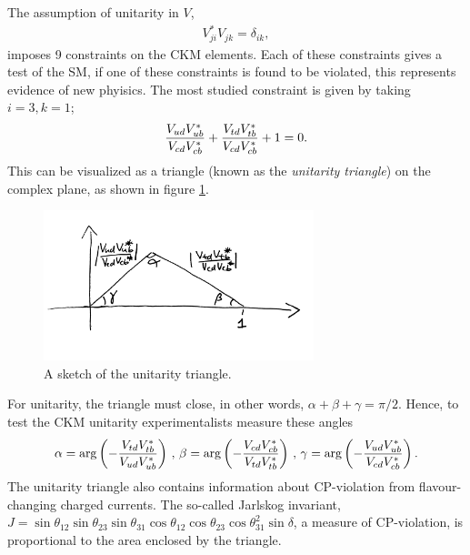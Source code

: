 The assumption of unitarity in $V$,
\begin{align}
  V_{ji}^*V_{jk}=\delta_{ik},
  \label{eq:CKMunitarity}
\end{align}
imposes 9 constraints on the CKM elements. Each of these constraints gives a test of the SM, if one of these constraints is found to be violated, this represents evidence of new phyisics. The most studied constraint is given by taking $i=3,k=1$;
\begin{align}
  {V_{ud}V_{ub}^*\over V_{cd} V_{cb}^*} + {V_{td}V_{tb}^* \over V_{cd}V_{cb}^*} + 1 = 0.
\end{align}
This can be visualized as a triangle (known as the {\it{unitarity triangle}}) on the complex plane, as shown in figure \ref{fig:unitaritytriangle_sketch}.

\begin{figure}
  \vspace{-10pt}
  \begin{center}
    \includegraphics[width=0.7\textwidth]{images/unitaritytriangle_sketch.jpg}
  \end{center}
  \vspace{-25pt}
  \caption{A sketch of the unitarity triangle.}
  \label{fig:unitaritytriangle_sketch}
\end{figure}

For unitarity, the triangle must close, in other words, $\alpha+\beta+\gamma = \pi/2$. Hence, to test the CKM unitarity experimentalists measure these angles
\begin{align}
  \alpha = \arg \left( -{V_{td}V_{tb}^*\over V_{ud}V_{ub}^*}\right) \,,\,
  \beta = \arg \left( -{V_{cd}V_{cb}^*\over V_{td}V_{tb}^*} \right) \,,\,
  \gamma = \arg \left( -{V_{ud}V_{ub}^*\over V_{cd}V_{cb}^*} \right).
\end{align}
The unitarity triangle also contains information about CP-violation from flavour-changing charged currents. The so-called Jarlskog invariant, $J=\sin\theta_{12}\sin\theta_{23}\sin\theta_{31}\cos\theta_{12}\cos\theta_{23}\cos\theta_{31}^2\sin\delta$, a measure of CP-violation, is proportional to the area enclosed by the triangle.

